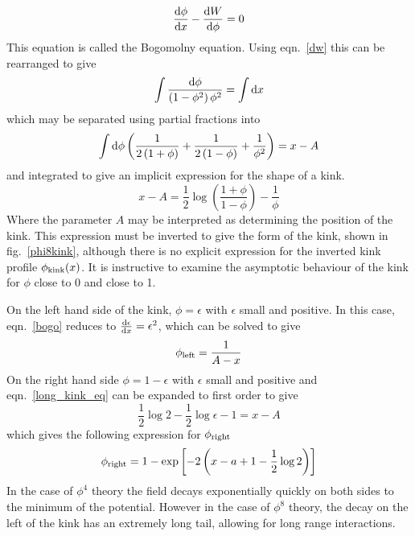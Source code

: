 \documentclass[11pt, oneside]{article}  	%
\numberwithin{equation}{section}
\newcommand{\drv}{\ensuremath{\textup{d}}}
\begin{document}
 \begin{equation}\label{bogo}
 \frac{\textup{d}\phi}{\textup{d}x} - \frac{\textup{d}W}{\textup{d}\phi} = 0
 \end{equation}
 This equation is called the Bogomolny equation. Using eqn.~\ref{dw} this can be rearranged to give
 \begin{equation}
 \int \frac{\drv\phi}{\left(1-\phi^2 \right ) \phi^2} = \int \drv x
 \end{equation}
 which may be separated using partial fractions into
 \begin{equation}
 \int\drv\phi \left (\frac{1}{2\left(1+\phi\right )} + \frac{1}{2\left(1-\phi\right )} + \frac{1}{\phi^2} \right) = x -A
 \end{equation}
 and integrated to give an implicit expression for the shape of a kink.
 \begin{equation}\label{long_kink_eq}
 x-A = \frac{1}{2}\log\left (\frac{1+\phi}{1-\phi} \right ) - \frac{1}{\phi}
 \end{equation}
 Where the parameter $A$ may be interpreted as determining the position of the kink. This expression must be inverted to give the form of the kink, shown in fig.~\ref{phi8kink}, although there is no explicit expression for the inverted kink profile $\phi_\textup{kink}(x)$. It is instructive to examine the asymptotic behaviour of the kink for $\phi$ close to 0 and close to 1. \par
 On the left hand side of the kink, $\phi = \epsilon$ with $\epsilon$ small and positive. In this case, eqn.~\ref{bogo} reduces to $\frac{\drv \epsilon}{\drv x} = \epsilon^2$, which can be solved to give 
 \begin{equation}
 \phi_\textup{left} = \frac{1}{A-x}
 \end{equation}
 On the right hand side $\phi = 1- \epsilon$ with $\epsilon$ small and positive and eqn.~\ref{long_kink_eq} can be expanded to first order to give
 \begin{equation}
 \frac{1}{2} \log2 - \frac{1}{2} \log \epsilon - 1 = x-A
 \end{equation}
 which gives the following expression for $\phi_{\textup{right}}$
 \begin{equation}
 \phi_{\textup{right}} = 1- \exp\left [ -2\left ( x - a + 1 - \frac{1}{2}\log2 \right ) \right ]
 \end{equation}
 In the case of $\phi^4$ theory the field decays exponentially quickly on both sides to the minimum of the potential. However in the case of $\phi^8$ theory, the decay on the left of the kink has an extremely long tail, allowing for long range interactions.\par
\end{document}
